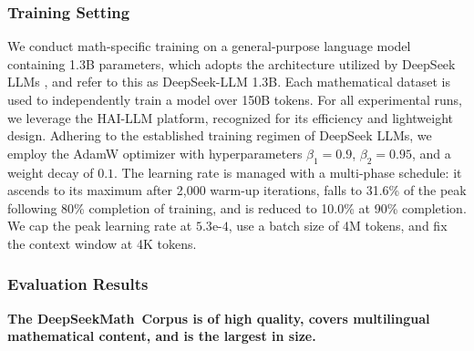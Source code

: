 \begin{itemize}[topsep=0pt]
\subsubsection{Training Setting}
\label{sec:quality-policy}
We conduct math-specific training on a general-purpose language model containing 1.3B parameters, which adopts the architecture utilized by DeepSeek LLMs \citep{deepseek-llm}, and refer to this as DeepSeek-LLM 1.3B. Each mathematical dataset is used to independently train a model over 150B tokens. For all experimental runs, we leverage the HAI-LLM \citep{haillm} platform, recognized for its efficiency and lightweight design. Adhering to the established training regimen of DeepSeek LLMs, we employ the AdamW optimizer \citep{adamW} with hyperparameters $\beta_1=0.9$, $\beta_2=0.95$, and a weight decay of $0.1$. The learning rate is managed with a multi-phase schedule: it ascends to its maximum after 2{,}000 warm-up iterations, falls to 31.6\% of the peak following 80\% completion of training, and is reduced to 10.0\% at 90\% completion. We cap the peak learning rate at $5.3\text{e-}4$, use a batch size of 4M tokens, and fix the context window at 4K tokens.

\subsubsection{Evaluation Results}

\textbf{The DeepSeekMath~Corpus is of high quality, covers multilingual mathematical content, and is the largest in size.}


\end{itemize}
